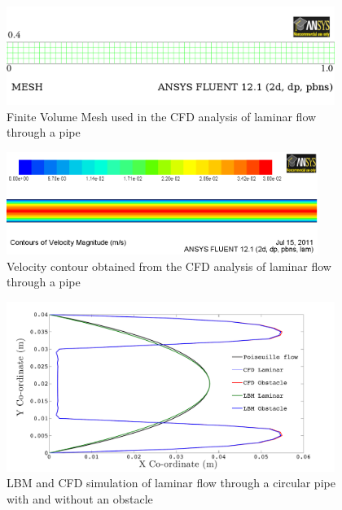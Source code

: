 \begin{figure}[h]
\centering
\includegraphics[width=0.95\textwidth]{CFD_Mesh}
\caption{Finite Volume Mesh used in the CFD analysis of laminar flow through a pipe}
\label{fig:mesh}
\end{figure}


\begin{figure}[h]
\centering
\includegraphics[width=0.9\textwidth]{CFD_Poiseuille}
\caption{Velocity contour obtained from the CFD analysis of laminar flow through a pipe}
\label{fig:cont}
\end{figure}


\begin{figure}[h]
\centering
\includegraphics[width=0.95\textwidth]{LBMCFD}
\caption{LBM and CFD simulation of laminar flow through a circular pipe with and without an obstacle}
\label{fig:LBM}
\end{figure}

